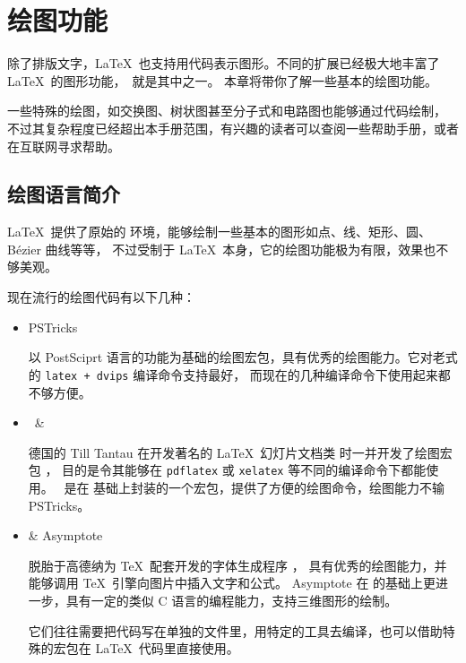 \chapter{绘图功能}\label{chap:graphics}

\begin{intro}
除了排版文字，\LaTeX\ 也支持用代码表示图形。不同的扩展已经极大地丰富了 \LaTeX\ 的图形功能，\TikZ\ 就是其中之一。
本章将带你了解一些基本的绘图功能。

一些特殊的绘图，如交换图、树状图甚至分子式和电路图也能够通过代码绘制，
不过其复杂程度已经超出本手册范围，有兴趣的读者可以查阅一些帮助手册，或者在互联网寻求帮助。
\end{intro}

\section{绘图语言简介}\label{sec:pict-lang}

\LaTeX\ 提供了原始的  环境，能够绘制一些基本的图形如点、线、矩形、圆、B\'ezier 曲线等等，
不过受制于 \LaTeX\ 本身，它的绘图功能极为有限，效果也不够美观。

现在流行的绘图代码有以下几种：
\begin{itemize}
  \item PSTricks \par
  以 PostSciprt 语言的功能为基础的绘图宏包，具有优秀的绘图能力。它对老式的 \texttt{latex + dvips} 编译命令支持最好，
  而现在的几种编译命令下使用起来都不够方便。

  \item \TikZ\ \&  \par
  德国的 Till Tantau 在开发著名的 \LaTeX\ 幻灯片文档类  时一并开发了绘图宏包 ，
  目的是令其能够在 \texttt{pdflatex} 或 \texttt{xelatex} 等不同的编译命令下都能使用。
  \TikZ\ 是在  基础上封装的一个宏包，提供了方便的绘图命令，绘图能力不输 PSTricks。

  \item {} \& Asymptote \par
   脱胎于高德纳为 \TeX\ 配套开发的字体生成程序 ，
  具有优秀的绘图能力，并能够调用 \TeX\ 引擎向图片中插入文字和公式。
  Asymptote 在  的基础上更进一步，具有一定的类似 C 语言的编程能力，支持三维图形的绘制。\par
  它们往往需要把代码写在单独的文件里，用特定的工具去编译，也可以借助特殊的宏包在 \LaTeX\ 代码里直接使用。
\end{itemize}

